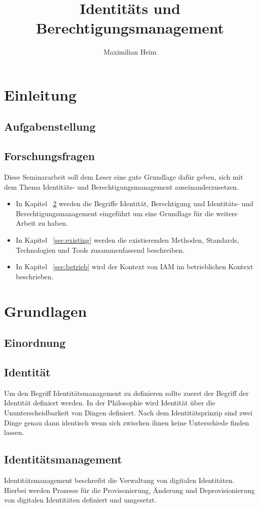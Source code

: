 \documentclass[10pt]{article}
\author{Maximilian Heim}
\title{Identitäts und Berechtigungsmanagement}
\begin{document}
\maketitle
\newpage
\tableofcontents
\newpage
\section{Einleitung}
\subsection{Aufgabenstellung}
\subsection{Forschungsfragen}
Diese Seminararbeit soll dem Leser eine gute Grundlage dafür geben, sich mit dem Thema Identitäts- und Berechtigungsmanagement auseinanderzusetzen.
\begin{itemize}
  \item In Kapitel ~\cref{sec:grundlagen} werden die Begriffe Identität, Berechtigung und Identitäts- und Berechtigungsmanagement eingeführt um eine Grundlage für die weitere Arbeit zu haben.
  \item In Kapitel ~\cref{sec:existing} werden die existierenden Methoden, Standards, Technologien und Tools zusammenfassend beschreiben.
  \item In Kapitel ~\cref{sec:betrieb} wird der Kontext von IAM im betrieblichen Kontext beschrieben.
\end{itemize}
\section{Grundlagen}
\label{sec:grundlagen}
\subsection{Einordnung}
\subsection{Identität}
Um den Begriff Identitätsmanagement zu definieren sollte zuerst der Begriff der Identität definiert werden. In der Philosophie wird Identität über die Ununterscheidbarkeit von Dingen definiert. Nach dem Identitätsprinzip sind zwei Dinge genau dann identisch wenn sich zwischen ihnen keine Unterschiede finden lassen.
\subsection{Identitätsmanagement}
Identitätsmanagement beschreibt die Verwaltung von digitalen Identitäten. Hierbei werden Prozesse für die Provisonierung, Änderung und Deprovisionierung von digitalen Identitäten definiert und umgesetzt.~\cite{sharma2016identity}
\end{document}
